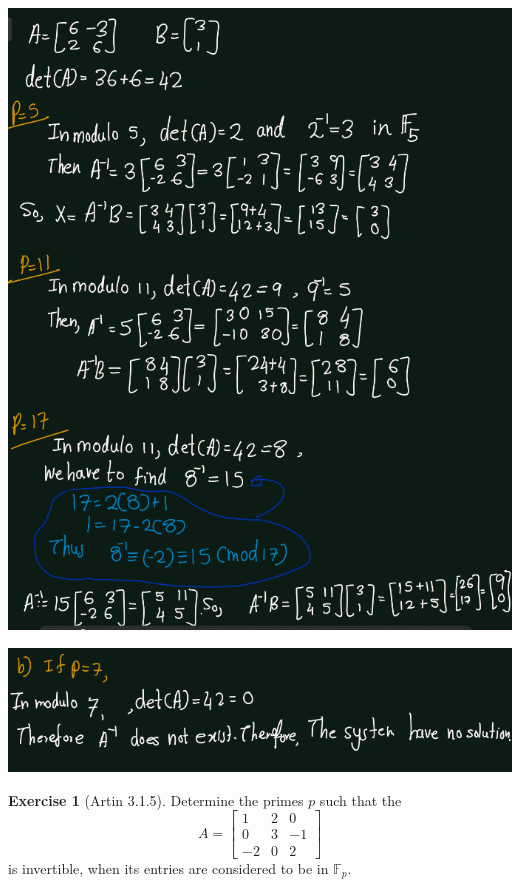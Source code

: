 \documentclass[
]{book}
\theoremstyle{definition}
\theoremstyle{definition}
\theoremstyle{definition}
\newtheorem{exercise}{Exercise}[chapter]
\theoremstyle{definition}
\theoremstyle{remark}
\begin{document}
\includegraphics{figures/ch_3/ex-1.4-1.png}

\includegraphics{figures/ch_3/ex-1.4-2.png}

\begin{exercise}[Artin 3.1.5]
\protect\hypertarget{exr:unnamed-chunk-255}{}\label{exr:unnamed-chunk-255}Determine the primes \(p\) such that the
\[A =\begin{bmatrix} 1 & 2 & 0 \\ 0 & 3 & -1 \\ -2 & 0 & 2 \end{bmatrix}\]
is invertible, when its entries are considered to be in \(\mathbb{F}_p\).
\end{exercise}
\end{document}
